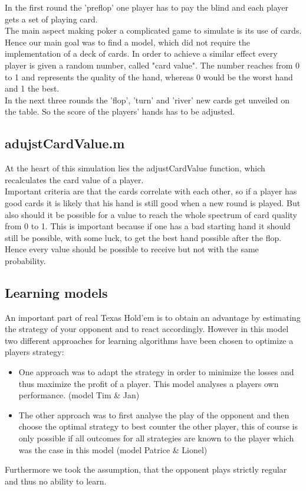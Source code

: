 \documentclass[11pt]{article}
\begin{document}
In the first round the 'preflop' one player has to pay the blind and each player gets a set of playing card.\\

The main aspect making poker a complicated game to simulate is its use of cards. Hence our main goal was to find a model, which did not require the implementation of a deck of cards. In order to achieve a similar effect every player is given a random number, called "card value". The number reaches from 0 to 1 and represents the quality of the hand, whereas 0 would be the worst hand and 1 the best.\\

In the next three rounds the 'flop', 'turn' and 'river' new cards get unveiled on the table. So the score of the players' hands has to be adjusted.

 

\subsection{adujstCardValue.m}

At the heart of this simulation lies the adjustCardValue function, which recalculates the card value of a player.\\

Important criteria are that the cards correlate with each other, so if a player has good cards it is likely that his hand is still good when a new round is played. But also should it be possible for a value to reach the whole spectrum of card quality from 0 to 1. This is important because if one has a bad starting hand it should still be possible, with some luck, to get the best hand possible after the flop. Hence every value should be possible to receive but not with the same probability.\\


\subsection{Learning models}
An important part of real Texas Hold’em is to obtain an advantage by estimating the strategy of your opponent and to react accordingly.
However in this model two different approaches for learning algorithms have been chosen to optimize a players strategy:
\begin{itemize}
\item One approach was to adapt the strategy in order to minimize the losses and thus maximize the profit of a player. This model analyses a players own performance. (model Tim \& Jan)%
\item  The other approach was to first analyse the play of the opponent and then choose the optimal strategy to best counter the other player, this of course is only possible if all outcomes for all strategies are known to the player which was the case in this model (model Patrice \& Lionel)\\
\end{itemize}
Furthermore we took the assumption, that the opponent plays strictly regular and thus no ability to learn.
\end{document}

